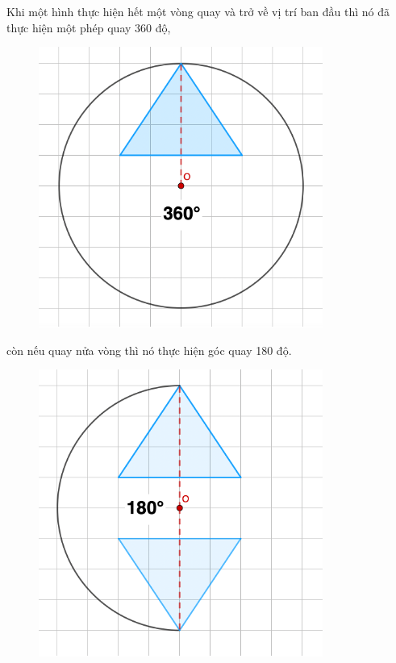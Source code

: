 \begin{multicols}{2}
\begin{figure}[H]
		\vspace*{-10pt}
	\end{figure}
	Khi một hình thực hiện hết một vòng quay và trở về vị trí ban đầu thì nó đã thực hiện một phép quay $360$ độ, 
	\begin{figure}[H]
		\vspace*{-5pt}
		\centering
		\captionsetup{labelformat= empty, justification=centering}
		\includegraphics[width= 1\linewidth]{Picture20}
		\vspace*{-10pt}
	\end{figure}
	còn nếu quay nửa vòng thì nó thực hiện góc quay 180 độ.
	\begin{figure}[H]
		\vspace*{-5pt}
		\centering
		\captionsetup{labelformat= empty, justification=centering}
		\includegraphics[width= 1\linewidth]{Picture21}

\end{figure}
\end{multicols}
